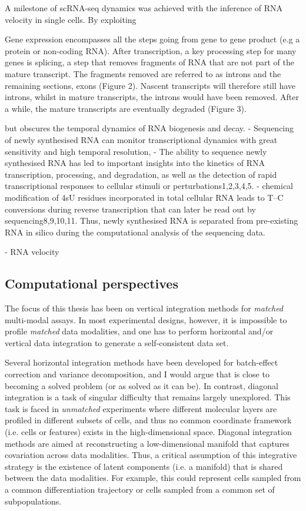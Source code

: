 A milestone of scRNA-seq dynamics was achieved with the inference of RNA velocity in single cells. By exploiting 

Gene expression encompasses all the steps going from gene to gene product (e.g a protein or non-coding RNA). After transcription, a key processing step for many genes is splicing, a step that removes fragments of RNA that are not part of the mature transcript. The fragments removed are referred to as introns and the remaining sections, exons (Figure 2). Nascent transcripts will therefore still have introns, whilst in mature transcripts, the introns would have been removed. After a while, the mature transcripts are eventually degraded (Figure 3).





 but obscures the temporal dynamics of RNA biogenesis and decay. 
- Sequencing of newly synthesised RNA can monitor transcriptional dynamics with great sensitivity and high temporal resolution,
- The ability to sequence newly synthesised RNA has led to important insights into the kinetics of RNA transcription, processing, and degradation, as well as the detection of rapid transcriptional responses to cellular stimuli or perturbations1,2,3,4,5.
- chemical modification of 4sU residues incorporated in total cellular RNA leads to T–C conversions during reverse transcription that can later be read out by sequencing8,9,10,11. Thus, newly synthesised RNA is separated from pre-existing RNA in silico during the computational analysis of the sequencing data.


- RNA velocity




\subsection{Computational perspectives} 

The focus of this thesis has been on vertical integration methods for \textit{matched} multi-modal assays. In most experimental designs, however, it is impossible to profile \textit{matched} data modalities, and one has to perform horizontal and/or vertical data integration to generate a self-consistent data set.

Several horizontal integration methods have been developed for batch-effect correction and variance decomposition, and I would argue that is close to becoming a solved problem (or as solved as it can be). In contrast, diagonal integration is a task of singular difficulty that remains largely unexplored. This task is faced in \textit{unmatched} experiments where different molecular layers are profiled in different subsets of cells, and thus no common coordinate framework (i.e. cells or features) exists in the high-dimensional space. Diagonal integration methods are aimed at reconstructing a low-dimensional manifold that captures covariation across data modalities. Thus, a critical assumption of this integrative strategy is the existence of latent components (i.e. a manifold) that is shared between the data modalities. For example, this could represent cells sampled from a common differentiation trajectory or cells sampled from a common set of subpopulations.

